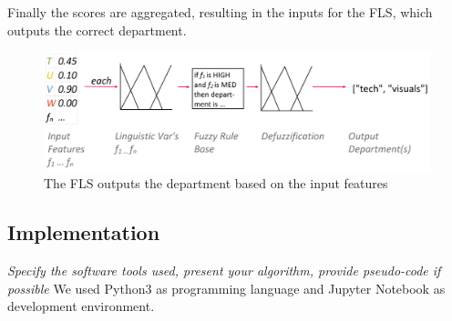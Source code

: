 \documentclass[journal]{IEEEtran}
\begin{document}
\begin{enumerate}
    Finally the scores are aggregated, resulting in the inputs for the FLS, which outputs the correct department.

    \begin{figure}[ht!]
        \centering
        \includegraphics[width=.9\linewidth]{res/classifying}
        \caption{The FLS outputs the department based on the input features}
        \label{fig:classifying}
    \end{figure}

\end{enumerate}


\subsection{Implementation}
\textit{Specify the software tools used, present your algorithm,
provide pseudo-code if possible}
We used Python3 as programming language and Jupyter Notebook as development environment. 

\end{document}
